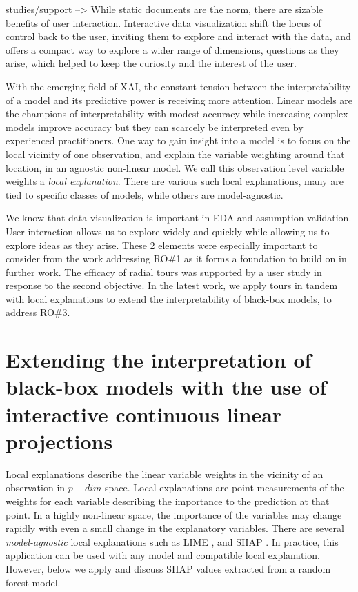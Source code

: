 \documentclass{template/monashthesis}
\begin{document}
studies/support --\textgreater{}
While static documents are the norm, there are sizable benefits of user interaction. Interactive data visualization shift the locus of control back to the user, inviting them to explore and interact with the data, and offers a compact way to explore a wider range of dimensions, questions as they arise, which helped to keep the curiosity and the interest of the user.

With the emerging field of XAI, the constant tension between the interpretability of a model and its predictive power is receiving more attention. Linear models are the champions of interpretability with modest accuracy while increasing complex models improve accuracy but they can scarcely be interpreted even by experienced practitioners. One way to gain insight into a model is to focus on the local vicinity of one observation, and explain the variable weighting around that location, in an agnostic non-linear model. We call this observation level variable weights a \emph{local explanation}. There are various such local explanations, many are tied to specific classes of models, while others are model-agnostic.

We know that data visualization is important in EDA and assumption validation. User interaction allows us to explore widely and quickly while allowing us to explore ideas as they arise. These 2 elements were especially important to consider from the work addressing RO\#1 as it forms a foundation to build on in further work. The efficacy of radial tours was supported by a user study in response to the second objective. In the latest work, we apply tours in tandem with local explanations to extend the interpretability of black-box models, to address RO\#3.

\hypertarget{extending-the-interpretation-of-black-box-models-with-the-use-of-interactive-continuous-linear-projections}{%
\section{Extending the interpretation of black-box models with the use of interactive continuous linear projections}\label{extending-the-interpretation-of-black-box-models-with-the-use-of-interactive-continuous-linear-projections}}

Local explanations describe the linear variable weights in the vicinity of an observation in \(p-dim\) space. Local explanations are point-measurements of the weights for each variable describing the importance to the prediction at that point. In a highly non-linear space, the importance of the variables may change rapidly with even a small change in the explanatory variables. There are several \emph{model-agnostic} local explanations such as LIME \autocite{ribeiro_why_2016}, and SHAP \autocite{lundberg_unified_2017}. In practice, this application can be used with any model and compatible local explanation. However, below we apply and discuss SHAP values extracted from a random forest model.
\end{document}
